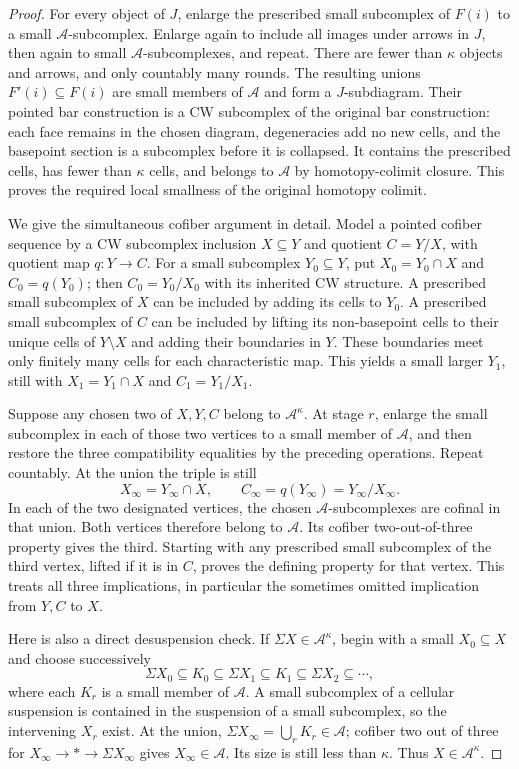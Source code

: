 \begin{proof}
For every object of $J$, enlarge the prescribed small subcomplex of $F(i)$ to a small $\mathcal A$-subcomplex. Enlarge again to include all images under arrows in $J$, then again to small $\mathcal A$-subcomplexes, and repeat. There are fewer than $\kappa$ objects and arrows, and only countably many rounds. The resulting unions $F'(i)\subseteq F(i)$ are small members of $\mathcal A$ and form a $J$-subdiagram. Their pointed bar construction is a CW subcomplex of the original bar construction: each face remains in the chosen diagram, degeneracies add no new cells, and the basepoint section is a subcomplex before it is collapsed. It contains the prescribed cells, has fewer than $\kappa$ cells, and belongs to $\mathcal A$ by homotopy-colimit closure. This proves the required local smallness of the original homotopy colimit.

We give the simultaneous cofiber argument in detail. Model a pointed cofiber sequence by a CW subcomplex inclusion $X\subseteq Y$ and quotient $C=Y/X$, with quotient map $q:Y\to C$. For a small subcomplex $Y_0\subseteq Y$, put $X_0=Y_0\cap X$ and $C_0=q(Y_0)$; then $C_0=Y_0/X_0$ with its inherited CW structure. A prescribed small subcomplex of $X$ can be included by adding its cells to $Y_0$. A prescribed small subcomplex of $C$ can be included by lifting its non-basepoint cells to their unique cells of $Y\setminus X$ and adding their boundaries in $Y$. These boundaries meet only finitely many cells for each characteristic map. This yields a small larger $Y_1$, still with $X_1=Y_1\cap X$ and $C_1=Y_1/X_1$.

Suppose any chosen two of $X,Y,C$ belong to $\mathcal A^\kappa$. At stage $r$, enlarge the small subcomplex in each of those two vertices to a small member of $\mathcal A$, and then restore the three compatibility equalities by the preceding operations. Repeat countably. At the union the triple is still
\[
 X_\infty=Y_\infty\cap X,
 \qquad C_\infty=q(Y_\infty)=Y_\infty/X_\infty.
\]
In each of the two designated vertices, the chosen $\mathcal A$-subcomplexes are cofinal in that union. Both vertices therefore belong to $\mathcal A$. Its cofiber two-out-of-three property gives the third. Starting with any prescribed small subcomplex of the third vertex, lifted if it is in $C$, proves the defining property for that vertex. This treats all three implications, in particular the sometimes omitted implication from $Y,C$ to $X$.

Here is also a direct desuspension check. If $\Sigma X\in\mathcal A^\kappa$, begin with a small $X_0\subseteq X$ and choose successively
\[
 \Sigma X_0\subseteq K_0\subseteq\Sigma X_1
       \subseteq K_1\subseteq\Sigma X_2\subseteq\cdots,
\]
where each $K_r$ is a small member of $\mathcal A$. A small subcomplex of a cellular suspension is contained in the suspension of a small subcomplex, so the intervening $X_r$ exist. At the union, $\Sigma X_\infty=\bigcup_rK_r\in\mathcal A$; cofiber two out of three for $X_\infty\to *\to\Sigma X_\infty$ gives $X_\infty\in\mathcal A$. Its size is still less than $\kappa$. Thus $X\in\mathcal A^\kappa$.


\end{proof}
